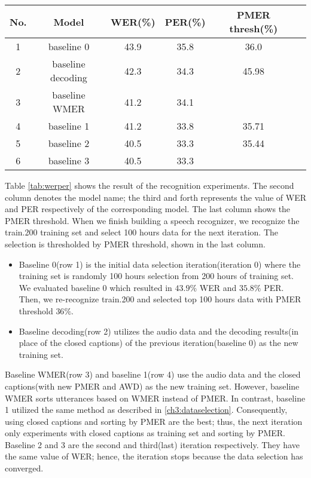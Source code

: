 \begin{center}
\label{tab:werper}
\begin{tabular}{| c | c | c | c | c | c |   }
\hline
No. & Model & WER(\%) & PER(\%) & PMER thresh(\%) \\ \hline
1 &  baseline 0 & 43.9 & 35.8 & 36.0  \\ \hline
2 &  baseline decoding & 42.3 & 34.3 & 45.98 \\ \hline
3 &  baseline WMER & 41.2 & 34.1 & \\ \hline
4 &  baseline 1 & 41.2 & 33.8  & 35.71 \\ \hline
5 & baseline 2 & 40.5 & 33.3  & 35.44 \\ \hline
6 & baseline 3 & 40.5 & 33.3  &  \\ \hline
\end{tabular}
\end{center}

Table \ref{tab:werper} shows the result of the recognition experiments. The second column denotes the model name; the third and forth represents the value of WER and PER respectively of the corresponding model. The last column shows the PMER threshold. When we finish building a speech recognizer, we recognize the train.200 training set and select 100 hours data for the next iteration. The selection is thresholded by PMER threshold, shown in the last column.

\begin{itemize}
\item Baseline 0(row 1)  is the initial data selection iteration(iteration 0) where the training set is randomly 100 hours selection from 200 hours of training set. We evaluated baseline 0 which resulted in $43.9\%$ WER and $35.8\%$ PER. Then, we re-recognize train.200 and selected top 100 hours data with PMER threshold $36\%$.
\item Baseline decoding(row 2) utilizes the audio data and the decoding results(in place of the closed captions) of the previous iteration(baseline 0) as the new training set.
\end{itemize}


 Baseline WMER(row 3) and baseline 1(row 4) use the audio data and the closed captions(with new PMER and AWD) as the new training set. However, baseline WMER sorts utterances based on WMER instead of PMER. In contrast, baseline 1 utilized the same method as described in \ref{ch3:dataselection}. Consequently, using closed captions and sorting by PMER are the best; thus, the next iteration only experiments with closed captions as training set and sorting by PMER. Baseline 2 and 3 are the second and third(last) iteration respectively. They have the same value of WER; hence, the iteration stops because the data selection has converged.



